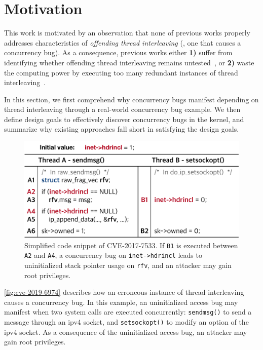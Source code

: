 \section{Motivation}
\label{s:motivation}







%
This work is motivated by an observation that none of previous works
properly addresses characteristics of \textit{offending thread
  interleaving} (\ie, one that causes a concurrency bug).
%
As a consequence, previous works either \textbf{1)} suffer from
identifying whether offending thread interleaving remains
untested~\cite{krace}, or \textbf{2)} waste the computing power by
executing too many redundant instances of thread
interleaving~\cite{snowboard, razzer}.


In this section, we first comprehend why concurrency bugs manifest
depending on thread interleaving through a real-world concurrency bug
example.
%
We then define design goals to effectively discover concurrency bugs
in the kernel, and summarize why existing approaches fall short in
satisfying the design goals.


%
\begin{figure}[t]
  \centering
  \includegraphics[width=0.95\linewidth]{fig/cve-2017-10661.pdf}
  \caption{Simplified code snippet of CVE-2017-7533. If \texttt{B1} is
    executed between \texttt{A2} and \texttt{A4}, a concurrency bug on
    \texttt{inet->hdrincl} leads to uninitialized stack pointer usage
    on \texttt{rfv}, and an attacker may gain root privileges.}
  \label{fig:cve-2019-6974}
\end{figure}
%
\autoref{fig:cve-2019-6974} describes how an erroneous instance of
thread interleaving causes a concurrency bug.
%
In this example, an uninitialized access bug may manifest when two
system calls are executed concurrently: \texttt{sendmsg()} to send a
message through an ipv4 socket, and \texttt{setsockopt()} to modify an
option of the ipv4 socket. As a consequence of the uninitialized
access bug, an attacker may gain root privileges.



